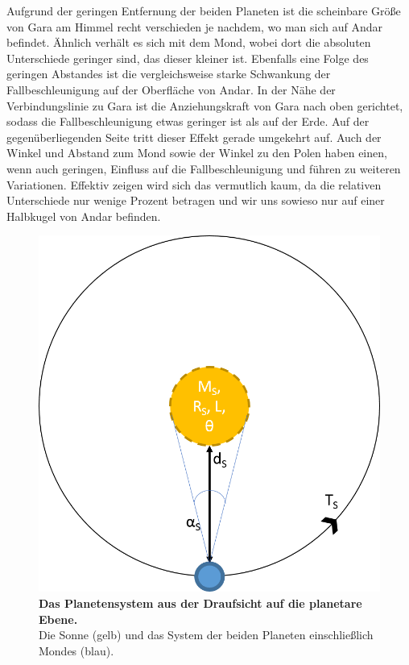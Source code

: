 \begin{outline}
	\1 Aufgrund der geringen Entfernung der beiden Planeten ist die scheinbare Größe von Gara am Himmel recht verschieden je nachdem, wo man sich auf Andar befindet. Ähnlich verhält es sich mit dem Mond, wobei dort die absoluten Unterschiede geringer sind, das dieser kleiner ist.
	\1 Ebenfalls eine Folge des geringen Abstandes ist die vergleichsweise starke Schwankung der Fallbeschleunigung auf der Oberfläche von Andar. In der Nähe der Verbindungslinie zu Gara ist die Anziehungskraft von Gara nach oben gerichtet, sodass die Fallbeschleunigung etwas geringer ist als auf der Erde. Auf der gegenüberliegenden Seite tritt dieser Effekt gerade umgekehrt auf. Auch der Winkel und Abstand zum Mond sowie der Winkel zu den Polen haben einen, wenn auch geringen, Einfluss auf die Fallbeschleunigung und führen zu weiteren Variationen. Effektiv zeigen wird sich das vermutlich kaum, da die relativen Unterschiede nur wenige Prozent betragen und wir uns sowieso nur auf einer Halbkugel von Andar befinden.
\end{outline}

\begin{figure}[tbh]
	\centering
	\includegraphics[width=0.9\linewidth]{Abbildungen/Weltenbau/Welt/planetensystem-fern}
	\caption[Planetensystem Skizzen 1]{\textbf{Das Planetensystem aus der Draufsicht auf die planetare Ebene.}\\
	Die Sonne (gelb) und das System der beiden Planeten einschließlich Mondes (blau).}
	\label{fig:planetensystem-nah}
\end{figure}

